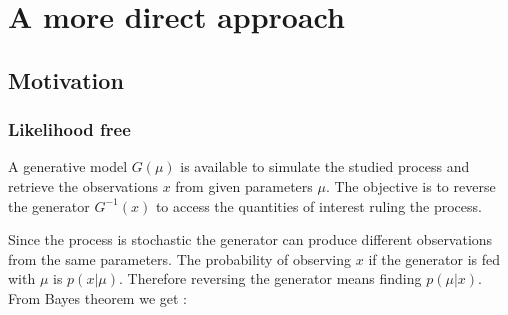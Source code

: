 
\chapter{A more direct approach}
\label{chap:direct_approach}

\ifpdf
    \graphicspath{{Chapter3/Figs/Raster/}{Chapter3/Figs/PDF/}{Chapter3/Figs/}}
\else
    \graphicspath{{Chapter3/Figs/Vector/}{Chapter3/Figs/}}
\fi








\section{Motivation} %
\label{sec:motivation}






\subsection{Likelihood free} %
\label{sub:likelihood_free}


A generative model $G(\mu)$ is available to simulate the studied process and retrieve the observations $x$ from given parameters $\mu$.
The objective is to reverse the generator $G^{-1}(x)$ to access the quantities of interest ruling the process.

Since the process is stochastic the generator can produce different observations from the same parameters.
The probability of observing $x$ if the generator is fed with $\mu$ is $p(x | \mu)$.
Therefore reversing the generator means finding $p(\mu | x)$.
From Bayes theorem we get :

